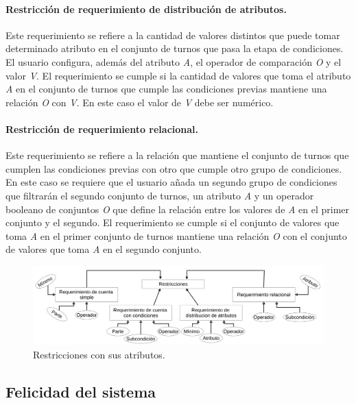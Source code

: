 \paragraph{Restricción de requerimiento de distribución de atributos.} Este requerimiento se refiere a la cantidad de valores distintos que puede tomar determinado atributo en el conjunto de turnos que pasa la etapa de condiciones. El usuario configura, además del atributo \textit{A}, el operador de comparación \textit{O} y el valor \textit{V}. El requerimiento se cumple si la cantidad de valores que toma el atributo \textit{A} en el conjunto de turnos que cumple las condiciones previas mantiene una relación \textit{O} con  \textit{V}. En este caso el valor de \textit{V} debe ser numérico.

\paragraph{Restricción de requerimiento relacional.} Este requerimiento se refiere a la relación que mantiene el conjunto de turnos que cumplen las condiciones previas con otro que cumple otro grupo de condiciones. En este caso se requiere que el usuario añada un segundo grupo de condiciones que filtrarán el segundo conjunto de turnos, un atributo \textit{A} y un operador booleano de conjuntos \textit{O} que define la relación entre los valores de \textit{A}
en el primer conjunto y el segundo. El requerimiento se cumple si el conjunto de valores que toma \textit{A} en el primer conjunto de turnos mantiene una relación \textit{O} con el conjunto de valores que toma \textit{A} en el segundo conjunto.

\begin{figure}[h!]
	\centering
	\includegraphics[width=0.95\linewidth]{images/Chapter 2/restrictions}
	\caption{Restricciones con sus atributos.}
	\label{fig:restrictions}
\end{figure}


\subsection{Felicidad del sistema}
\label{sec:happiness}

